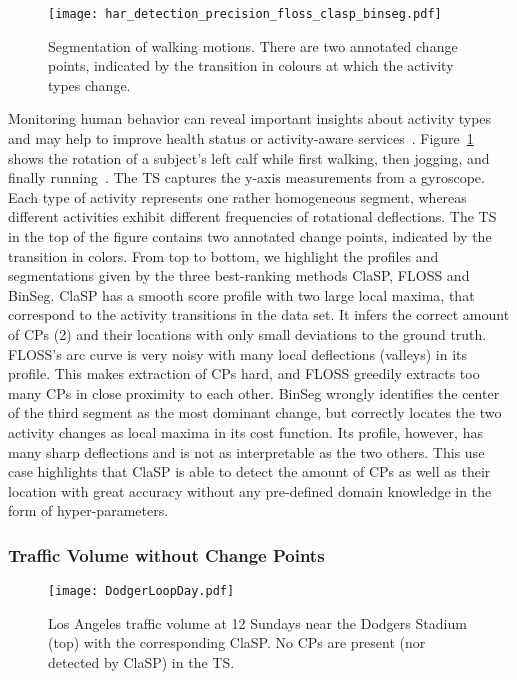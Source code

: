 \documentclass[pdflatex,sn-basic]{sn-jnl}
\begin{document}
\begin{figure}[t]
	\texttt{[image: har\_detection\_precision\_floss\_clasp\_binseg.pdf]}
	\caption{Segmentation of walking motions. There are two annotated change points, indicated by the transition in colours at which the activity types change.
	\label{fig:har}
	}
\end{figure}

Monitoring human behavior can reveal important insights about activity types and may help to improve health status or activity-aware services~\citep{Feuz2015AutomatedDO}. Figure~\ref{fig:har} shows the rotation of a subject's left calf while first walking, then jogging, and finally running~\citep{Baos2014DealingWT}. The TS captures the y-axis measurements from a gyroscope. Each type of activity represents one rather homogeneous segment, whereas different activities exhibit different frequencies of rotational deflections. The TS in the top of the figure contains two annotated change points, indicated by the transition in colors. From top to bottom, we highlight the profiles and segmentations given by the three best-ranking methods ClaSP, FLOSS and BinSeg. ClaSP has a smooth score profile with two large local maxima, that correspond to the activity transitions in the data set. It infers the correct amount of CPs (2) and their locations with only small deviations to the ground truth. FLOSS's arc curve is very noisy with many local deflections (valleys) in its profile. This makes extraction of CPs hard, and FLOSS  greedily extracts too many CPs in close proximity to each other. BinSeg wrongly identifies the center of the third segment as the most dominant change, but correctly locates the two activity changes as local maxima in its cost function. Its profile, however, has many sharp deflections and is not as interpretable as the two others. This use case highlights that ClaSP is able to detect the amount of CPs as well as their location with great accuracy without any pre-defined domain knowledge in the form of hyper-parameters. 


\subsubsection*{Traffic Volume without Change Points}

\begin{figure}[t]
	\texttt{[image: DodgerLoopDay.pdf]}
	\caption{Los Angeles traffic volume at 12 Sundays near the Dodgers Stadium (top) with the corresponding ClaSP. No CPs are present (nor detected by ClaSP) in the TS.\label{fig:dodger-loop-day}
	}
\end{figure}
\end{document}
